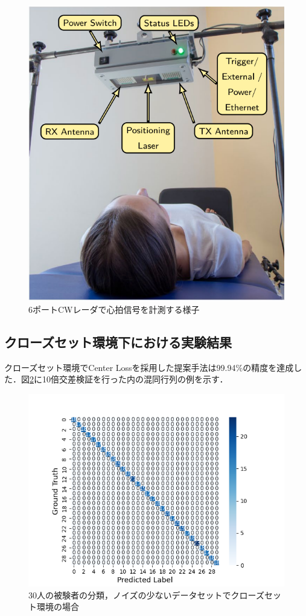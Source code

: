 \begin{figure}[H]
\begin{center}
\includegraphics[width=0.8\linewidth]{./fig/radar_setting_clean.png}
\end{center}
\caption{6ポートCWレーダで心拍信号を計測する様子}
\label{fig:setting_clean}
\end{figure}

\subsection{クローズセット環境下における実験結果}
クローズセット環境でCenter Lossを採用した提案手法は99.94\%の精度を達成した．図\ref{fig:30close-conf}に10倍交差検証を行った内の混同行列の例を示す．
\begin{figure}[H]
\begin{center}
\includegraphics[width=\linewidth]{./fig/clean_dataset/cross_val_Fold0_close.png}
\end{center}
\caption{30人の被験者の分類，ノイズの少ないデータセットでクローズセット環境の場合}
\label{fig:30close-conf}
\end{figure}

